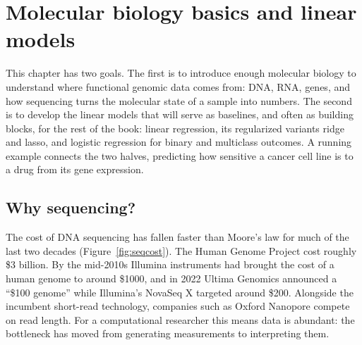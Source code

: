 
\providecommand{\R}{\mathbb{R}}
\providecommand{\E}{\mathbb{E}}
\providecommand{\Normal}{\mathcal{N}}
\providecommand{\argmax}{\operatorname*{arg\,max}}
\providecommand{\argmin}{\operatorname*{arg\,min}}
\providecommand{\vy}{\mathbf{y}}
\providecommand{\vx}{\mathbf{x}}
\providecommand{\mX}{\mathbf{X}}
\providecommand{\mI}{\mathbf{I}}
\providecommand{\vb}{\boldsymbol{\beta}}
\providecommand{\veps}{\boldsymbol{\epsilon}}
\providecommand{\vp}{\mathbf{p}}
\providecommand{\vg}{\mathbf{g}}
\providecommand{\ind}{\mathbf{1}}

\providecommand{\chaptertoc}{}
\chapter{Molecular biology basics and linear models}
\label{ch:regression}
\chaptertoc

This chapter has two goals. The first is to introduce enough molecular biology to understand where functional genomic data comes from: DNA, RNA, genes, and how sequencing turns the molecular state of a sample into numbers. The second is to develop the linear models that will serve as baselines, and often as building blocks, for the rest of the book: linear regression, its regularized variants ridge and lasso, and logistic regression for binary and multiclass outcomes. A running example connects the two halves, predicting how sensitive a cancer cell line is to a drug from its gene expression.

\section{Why sequencing?}

The cost of DNA sequencing has fallen faster than Moore's law for much of the last two decades (Figure~\ref{fig:seqcost}). The Human Genome Project cost roughly \$3 billion. By the mid-2010s Illumina instruments had brought the cost of a human genome to around \$1000, and in 2022 Ultima Genomics announced a ``\$100 genome'' while Illumina's NovaSeq X targeted around \$200. Alongside the incumbent short-read technology, companies such as Oxford Nanopore compete on read length. For a computational researcher this means data is abundant: the bottleneck has moved from generating measurements to interpreting them.

